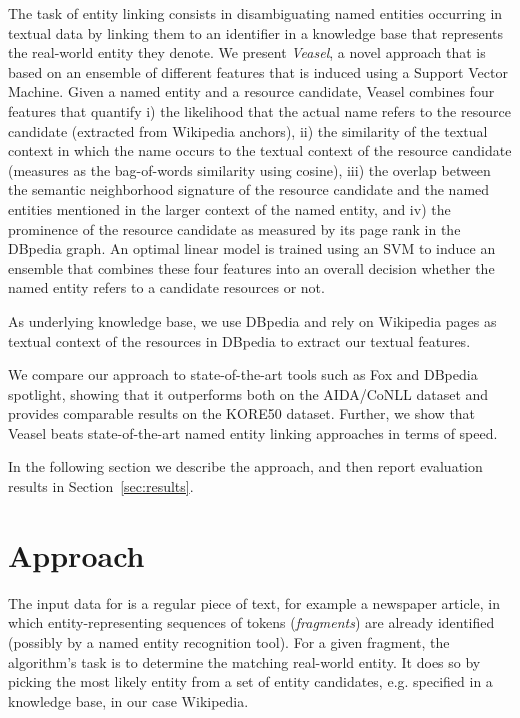 \documentclass[runningheads,a4paper]{llncs}
\begin{document}
The task of entity linking consists in disambiguating named entities occurring in textual data by linking them to an identifier in a knowledge base that represents the real-world entity they denote. We present \emph{Veasel}, a novel approach that is based on an ensemble of different features that is induced using a Support Vector Machine.  Given a named entity and a resource candidate, Veasel combines four features that quantify i) the likelihood that the actual name refers to the resource candidate (extracted from Wikipedia anchors), ii) the similarity of the textual context in which the name occurs to the textual context of the resource candidate (measures as the bag-of-words similarity using cosine), iii) the overlap between the semantic neighborhood signature of the resource candidate and the named entities mentioned in the larger context of the named entity, and iv) the prominence of the resource candidate as measured by its page rank in the DBpedia graph. An optimal linear model is trained using an SVM to induce an ensemble that combines these four features into an overall decision whether the named entity refers to a candidate resources or not.  

As underlying knowledge base, we use DBpedia and rely on Wikipedia pages as textual context of the resources in DBpedia to extract our textual features.

We compare our approach to state-of-the-art tools such as Fox and DBpedia spotlight, showing that it outperforms both on the AIDA/CoNLL dataset and provides comparable results on the KORE50 dataset. Further, we show that Veasel beats state-of-the-art named entity linking approaches in terms of speed.

In the following section we describe the approach, and then report evaluation results in Section~\ref{sec:results}.


\section{Approach}\label{sec:approach}

The input data for {\acronym} is a regular piece of text, for example a newspaper article, in which entity-representing sequences of tokens (\emph{fragments}) are already identified (possibly by a named entity recognition tool). For a given fragment, the algorithm's task is to determine the matching real-world entity. It does so by picking the most likely entity from a set of entity candidates, e.g. specified in a knowledge base, in our case Wikipedia. 
\end{document}

